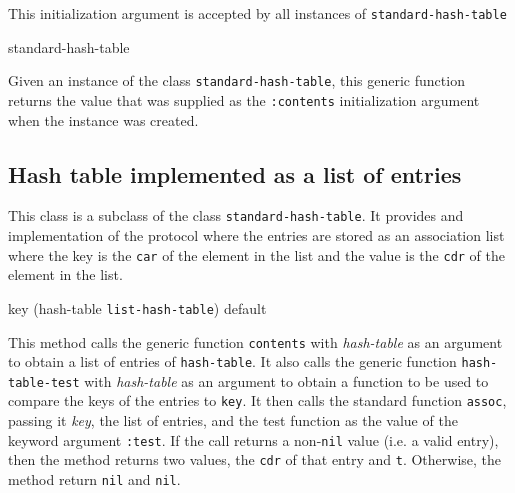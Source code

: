This initialization argument is accepted by all instances of
\texttt{standard-hash-table}

{\small{} {standard-hash-table}
}

Given an instance of the class \texttt{standard-hash-table}, this
generic function returns the value that was supplied as the
\texttt{:contents} initialization argument when the instance was
created.

\subsection{Hash table implemented as a list of entries}


This class is a subclass of the class \texttt{standard-hash-table}.
It provides and implementation of the protocol where the entries are
stored as an association list where the key is the \texttt{car} of the
element in the list and the value is the \texttt{cdr} of the element
in the list.

{\small{} {key (hash-table {\tt list-hash-table})
    \optional default}
}

This method calls the generic function \texttt{contents} with
\textit{hash-table} as an argument to obtain a list of entries of
\texttt{hash-table}.  It also calls the generic function
\texttt{hash-table-test} with \textit{hash-table} as an argument to
obtain a function to be used to compare the keys of the entries to
\texttt{key}.  It then calls the standard \commonlisp function
\texttt{assoc}, passing it \textit{key}, the list of entries, and the
test function as the value of the keyword argument \texttt{:test}.  If
the call returns a non-\texttt{nil} value (i.e. a valid entry), then
the method returns two values, the \texttt{cdr} of that entry and
\texttt{t}.  Otherwise, the method return \texttt{nil} and
\texttt{nil}.
